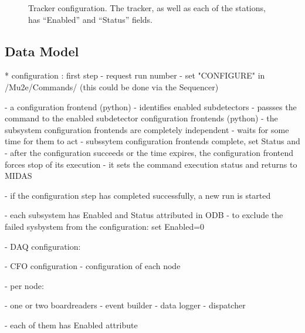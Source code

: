\begin{figure}[H]
  \caption{
    \label{figure:tracker_config}
    Tracker configuration. The tracker, as well as each of the stations, has ``Enabled'' and
    ``Status'' fields.
  }
\end{figure}



\subsection{Data Model}

* configuration  : first step                                                
- request run number
- set "CONFIGURE" in /Mu2e/Commands/ (this could be done via the Sequencer)

- a configuration frontend (python)
  - identifies enabled subdetectors
  - passses the command to the enabled subdetector configuration frontends (python)
  - the subsystem configuration frontends are completely independent
  - waits for some time for them to act
  - subssytem configuration frontends complete, set Status and 
  - after the configuration succeeds or the time expires, the configuration
    frontend forces stop of its execution
  - it sets the command execution status and returns to MIDAS

- if the configuration step has completed successfully, a new run is started

- each subsystem has Enabled and Status attributed in ODB
- to exclude the failed sysbystem from the configuration: set Enabled=0

- DAQ configuration:

  - CFO configuration
  - configuration of each node

  - per node:

    - one or two boardreaders
    - event builder
    - data logger
    - dispatcher

    - each of them has Enabled attribute


